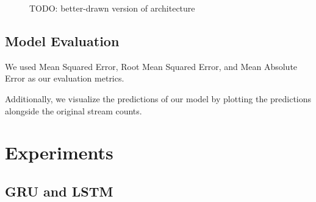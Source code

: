 \documentclass[11pt]{article}
\begin{document}
\begin{figure}
    \centering{}
    \caption{TODO: better-drawn version of architecture}
\end{figure}

\subsection{Model Evaluation}
We used Mean Squared Error, Root Mean Squared Error, and Mean Absolute Error as our evaluation metrics. 

Additionally, we visualize the predictions of our model by plotting the predictions alongside the original stream counts.


% 
% 
% 
% 
\section{Experiments}

\subsection{GRU and LSTM}
\end{document}
